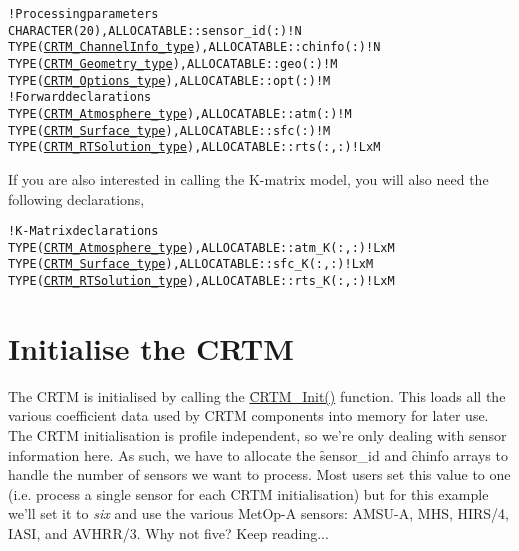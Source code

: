 \begin{alltt}
  ! Processing parameters
  CHARACTER(20)               , ALLOCATABLE :: sensor_id(:)  ! N
  TYPE(\hyperref[fig:CRTM_ChannelInfo_type_structure]{CRTM_ChannelInfo_type}) , ALLOCATABLE :: chinfo(:)     ! N
  TYPE(\hyperref[fig:CRTM_Geometry_type_structure]{CRTM_Geometry_type})    , ALLOCATABLE :: geo(:)        ! M
  TYPE(\hyperref[fig:CRTM_Options_type_structure]{CRTM_Options_type})     , ALLOCATABLE :: opt(:)        ! M
  ! Forward declarations
  TYPE(\hyperref[fig:CRTM_Atmosphere_type_structure]{CRTM_Atmosphere_type})  , ALLOCATABLE :: atm(:)        ! M
  TYPE(\hyperref[fig:CRTM_Surface_type_structure]{CRTM_Surface_type})     , ALLOCATABLE :: sfc(:)        ! M
  TYPE(\hyperref[fig:CRTM_RTSolution_type_structure]{CRTM_RTSolution_type})  , ALLOCATABLE :: rts(:,:)      ! L x M\end{alltt}

If you are also interested in calling the K-matrix model, you will also need the following declarations,

\begin{alltt}
  ! K-Matrix declarations
  TYPE(\hyperref[fig:CRTM_Atmosphere_type_structure]{CRTM_Atmosphere_type})  , ALLOCATABLE :: atm_K(:,:)  ! L x M
  TYPE(\hyperref[fig:CRTM_Surface_type_structure]{CRTM_Surface_type})     , ALLOCATABLE :: sfc_K(:,:)  ! L x M
  TYPE(\hyperref[fig:CRTM_RTSolution_type_structure]{CRTM_RTSolution_type})  , ALLOCATABLE :: rts_K(:,:)  ! L x M\end{alltt}



\section{Initialise the CRTM}
\label{sec:init_step}

The CRTM is initialised by calling the \hyperref[sec:CRTM_Init_interface]{\f{CRTM\_Init()}} function. This loads all the various coefficient data used by CRTM components into memory for later use. The CRTM initialisation is profile independent, so we're only dealing with sensor information here. As such, we have to allocate the \f{sensor\_id} and \f{chinfo} arrays to handle the number of sensors we want to process. Most users set this value to one (i.e. process a single sensor for each CRTM initialisation) but for this example we'll set it to \emph{six} and use the various MetOp-A sensors: AMSU-A, MHS, HIRS/4, IASI, and AVHRR/3. Why not five? Keep reading...

